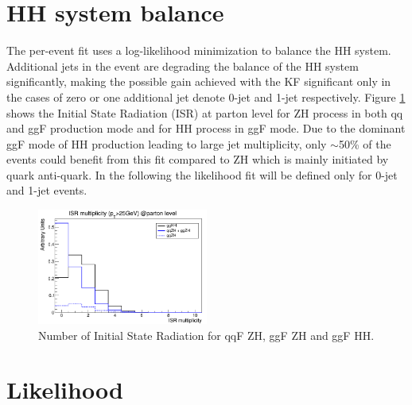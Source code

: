 \section{HH system balance}

The per-event fit uses a log-likelihood minimization to balance the HH system. Additional jets in the event are degrading the balance of the HH system significantly, making the possible gain achieved with the KF significant only in the cases of zero or one additional jet denote 0-jet and 1-jet respectively. Figure \ref{fig:Adx4:ISR} shows the Initial State Radiation (ISR) at parton level for ZH process in both qq and ggF production mode and for HH process in ggF mode. Due to the dominant ggF mode of HH production leading to large jet multiplicity, only $\sim$50\% of the events could benefit from this fit compared to ZH which is mainly initiated by quark anti-quark. In the following the likelihood fit will be defined only for 0-jet and 1-jet events.  
\begin{figure}[htbp]
    \centering
    \includegraphics[width=0.5\textwidth]{Adx/Adx4/Img/isr.png}
    \begin{tcolorbox}[colback=black!5!white,colframe=white!75!black]
    \caption{Number of Initial State Radiation for qqF ZH, ggF ZH and ggF HH.}
    \label{fig:Adx4:ISR}
    \end{tcolorbox}
    
\end{figure}

\section{Likelihood}

